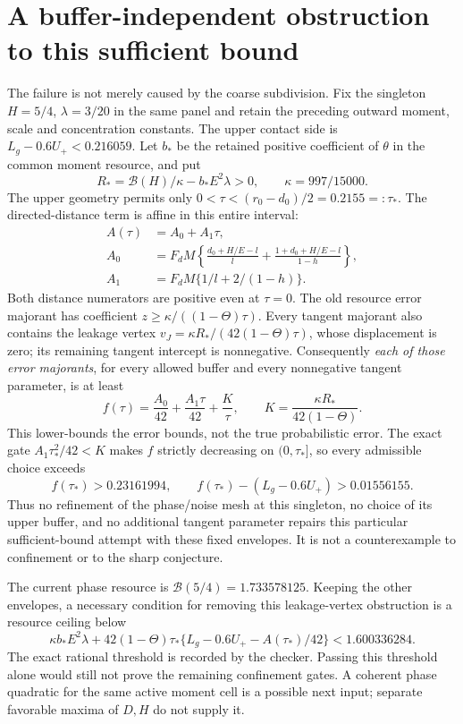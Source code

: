 \documentclass[11pt]{article}
\begin{document}
\section{A buffer-independent obstruction to this sufficient bound}
The failure is not merely caused by the coarse subdivision.
Fix the singleton $H=5/4$, $\lambda=3/20$ in the same panel and retain
the preceding outward moment, scale and concentration constants.
The upper contact side is
$L_g-0.6U_+<0.216059$.
Let $b_*$ be the retained positive coefficient of $\theta$ in the
common moment resource, and put
\[
 R_* =\mathcal B(H)/\kappa-b_*E^2\lambda>0,
 \qquad\kappa=997/15000.
\]
The upper geometry permits only
$0<\tau<(r_0-d_0)/2=0.2155=:\tau_*$.
The directed-distance term is affine in this entire interval:
\begin{align*}
 A(\tau)&=A_0+A_1\tau,\\
 A_0&=F_dM\left\{\frac{d_0+H/E-l}{l}
                   +\frac{1+d_0+H/E-l}{1-h}\right\},\\
 A_1&=F_dM\{1/l+2/(1-h)\}.
\end{align*}
Both distance numerators are positive even at $\tau=0$.
The old resource error majorant has coefficient
$z\ge\kappa/((1-\Theta)\tau)$.
Every tangent majorant also contains the leakage vertex
$v_J=\kappa R_*/(42(1-\Theta)\tau)$, whose displacement is zero;
its remaining tangent intercept is nonnegative.
Consequently \emph{each of those error majorants}, for every allowed
buffer and every nonnegative tangent parameter, is at least
\[
 f(\tau)=\frac{A_0}{42}+\frac{A_1\tau}{42}+\frac K\tau,
 \qquad K=\frac{\kappa R_*}{42(1-\Theta)}.
\]
This lower-bounds the error bounds, not the true probabilistic error.
The exact gate $A_1\tau_*^2/42<K$ makes $f$ strictly decreasing on
$(0,\tau_*]$, so every admissible choice exceeds
\[
 f(\tau_*)>0.23161994,
 \qquad f(\tau_*)-(L_g-0.6U_+)>0.01556155.
\]
Thus no refinement of the phase/noise mesh at this singleton, no choice
of its upper buffer, and no additional tangent parameter repairs this
particular sufficient-bound attempt with these fixed envelopes.
It is not a counterexample to confinement or to the sharp conjecture.

The current phase resource is $\mathcal B(5/4)=1.733578125$.
Keeping the other envelopes, a necessary condition for removing this
leakage-vertex obstruction is a resource ceiling below
\[
 \kappa b_*E^2\lambda+
 42(1-\Theta)\tau_*\{L_g-0.6U_+-A(\tau_*)/42\}
 <1.600336284.
\]
The exact rational threshold is recorded by the checker. Passing this
threshold alone would still not prove the remaining confinement gates.
A coherent phase quadratic for the same active moment cell is a possible
next input; separate favorable maxima of $D,H$ do not supply it.
\end{document}
